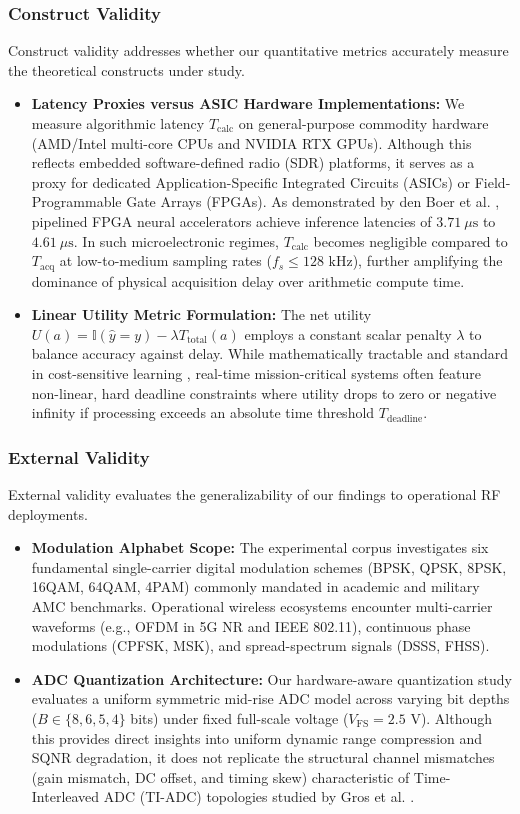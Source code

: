 \subsubsection{Construct Validity}
Construct validity addresses whether our quantitative metrics accurately measure the theoretical constructs under study.
\begin{itemize}
    \item \textbf{Latency Proxies versus ASIC Hardware Implementations:} We measure algorithmic latency $T_{\text{calc}}$ on general-purpose commodity hardware (AMD/Intel multi-core CPUs and NVIDIA RTX GPUs). Although this reflects embedded software-defined radio (SDR) platforms, it serves as a proxy for dedicated Application-Specific Integrated Circuits (ASICs) or Field-Programmable Gate Arrays (FPGAs). As demonstrated by den Boer et al. \cite{denboer2021fpga}, pipelined FPGA neural accelerators achieve inference latencies of $3.71\ \mu\text{s}$ to $4.61\ \mu\text{s}$. In such microelectronic regimes, $T_{\text{calc}}$ becomes negligible compared to $T_{\text{acq}}$ at low-to-medium sampling rates ($f_s \le 128\text{ kHz}$), further amplifying the dominance of physical acquisition delay over arithmetic compute time.
    \item \textbf{Linear Utility Metric Formulation:} The net utility $U(a) = \mathbb{I}(\hat{y}=y) - \lambda T_{\text{total}}(a)$ employs a constant scalar penalty $\lambda$ to balance accuracy against delay. While mathematically tractable and standard in cost-sensitive learning \cite{liu2026beacon}, real-time mission-critical systems often feature non-linear, hard deadline constraints where utility drops to zero or negative infinity if processing exceeds an absolute time threshold $T_{\text{deadline}}$.
\end{itemize}

\subsubsection{External Validity}
External validity evaluates the generalizability of our findings to operational RF deployments.
\begin{itemize}
    \item \textbf{Modulation Alphabet Scope:} The experimental corpus investigates six fundamental single-carrier digital modulation schemes (BPSK, QPSK, 8PSK, 16QAM, 64QAM, 4PAM) commonly mandated in academic and military AMC benchmarks. Operational wireless ecosystems encounter multi-carrier waveforms (e.g., OFDM in 5G NR and IEEE 802.11), continuous phase modulations (CPFSK, MSK), and spread-spectrum signals (DSSS, FHSS).
    \item \textbf{ADC Quantization Architecture:} Our hardware-aware quantization study evaluates a uniform symmetric mid-rise ADC model across varying bit depths ($B \in \{8, 6, 5, 4\}$ bits) under fixed full-scale voltage ($V_{\text{FS}} = 2.5\text{ V}$). Although this provides direct insights into uniform dynamic range compression and SQNR degradation, it does not replicate the structural channel mismatches (gain mismatch, DC offset, and timing skew) characteristic of Time-Interleaved ADC (TI-ADC) topologies studied by Gros et al. \cite{gros2025mitigating}.
\end{itemize}
